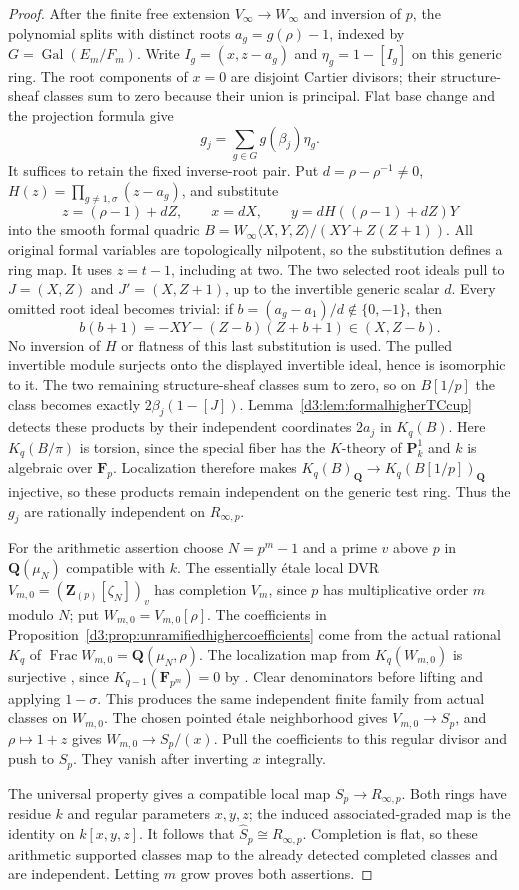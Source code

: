 \documentclass[11pt,a4paper]{amsart}
\numberwithin{equation}{section}
\theoremstyle{definition}
\theoremstyle{remark}
\newcommand{\Q}{\mathbf Q}
\newcommand{\Z}{\mathbf Z}
\newcommand{\F}{\mathbf F}
\newcommand{\Frac}{\operatorname{Frac}}
\begin{document}
\begin{proof}
After the finite free extension $V_\infty\to W_\infty$ and
inversion of $p$, the polynomial splits with distinct roots
$a_g=g(\rho)-1$, indexed by
$G=\operatorname{Gal}(E_m/F_m)$.
Write $I_g=(x,z-a_g)$ and $\eta_g=1-[I_g]$ on this generic ring.
The root components of $x=0$ are disjoint Cartier divisors;
their structure-sheaf classes sum to zero because their union is
principal. Flat base change and the projection formula give
\[
 g_j=\sum_{g\in G}g(\beta_j)\eta_g.
\]
It suffices to retain the fixed inverse-root pair.
Put $d=\rho-\rho^{-1}\ne0$,
$H(z)=\prod_{g\ne1,\sigma}(z-a_g)$, and substitute
\[
 z=(\rho-1)+dZ,\qquad x=dX,\qquad
 y=dH((\rho-1)+dZ)Y
\]
into the smooth formal quadric
$B=W_\infty\langle X,Y,Z\rangle/(XY+Z(Z+1))$.
All original formal variables are topologically nilpotent, so the
substitution defines a ring map. It uses $z=t-1$, including at two.
The two selected root ideals pull to $J=(X,Z)$ and $J'=(X,Z+1)$,
up to the invertible generic scalar $d$.
Every omitted root ideal becomes trivial: if
$b=(a_g-a_1)/d\notin\{0,-1\}$, then
\[
 b(b+1)=-XY-(Z-b)(Z+b+1)\in(X,Z-b).
\]
No inversion of $H$ or flatness of this last substitution is used.
The pulled invertible module surjects onto the displayed invertible
ideal, hence is isomorphic to it.
The two remaining structure-sheaf classes sum to zero, so on
$B[1/p]$ the class becomes exactly
$2\beta_j(1-[J])$.
Lemma~\ref{d3:lem:formalhigherTCcup} detects these products by their
independent coordinates $2a_j$ in $K_q(B)$.
Here $K_q(B/\pi)$ is torsion, since the special fiber has the
$K$-theory of $\mathbf P^1_k$ and $k$ is algebraic over $\F_p$.
Localization therefore makes $K_q(B)_{\Q}\to K_q(B[1/p])_{\Q}$
injective, so these products remain independent on the generic
test ring.
Thus the $g_j$ are rationally independent on $R_{\infty,p}$.

For the arithmetic assertion choose $N=p^m-1$ and a prime $v$
above $p$ in $\Q(\mu_N)$ compatible with $k$.
The essentially \'etale local DVR
$V_{m,0}=(\Z_{(p)}[\zeta_N])_v$ has completion $V_m$, since
$p$ has multiplicative order $m$ modulo $N$; put $W_{m,0}=V_{m,0}[\rho]$.
The coefficients in Proposition~\ref{d3:prop:unramifiedhighercoefficients}
come from the actual rational $K_q$ of
$\Frac W_{m,0}=\Q(\mu_N,\rho)$.
The localization map from $K_q(W_{m,0})$ is surjective
\cite[Sections~5--7]{Quillen}, since
$K_{q-1}(\F_{p^m})=0$ by
\cite{QuillenFinite}\cite[IV, Corollary~1.13]{Weibel}.
Clear denominators before lifting and applying $1-\sigma$.
This produces the same independent finite family from actual
classes on $W_{m,0}$.
The chosen pointed \'etale neighborhood gives $V_{m,0}\to S_p$,
and $\rho\mapsto1+z$ gives
$W_{m,0}\to S_p/(x)$.
Pull the coefficients to this regular divisor and push to $S_p$.
They vanish after inverting $x$ integrally.

The universal property gives a compatible local map
$S_p\to R_{\infty,p}$.
Both rings have residue $k$ and regular parameters $x,y,z$;
the induced associated-graded map is the identity on $k[x,y,z]$.
It follows that $\widehat S_p\cong R_{\infty,p}$.
Completion is flat, so these arithmetic supported classes map to
the already detected completed classes and are independent.
Letting $m$ grow proves both assertions.
\end{proof}
\end{document}
